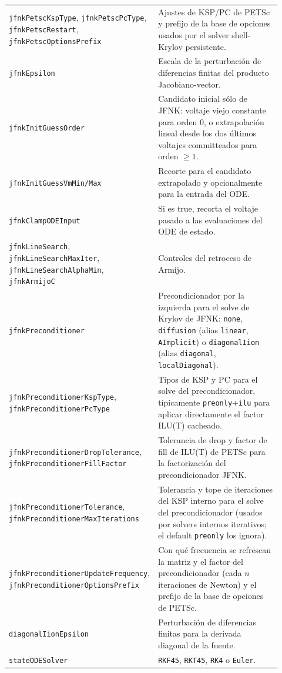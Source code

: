 \documentclass[11pt,a4paper]{article}
\newcommand{\code}[1]{\texttt{\small #1}}
\begin{document}
\begin{longtable}{@{}p{0.34\linewidth}p{0.58\linewidth}@{}}
\code{jfnkPetscKspType}, \code{jfnkPetscPcType}, \code{jfnkPetscRestart}, \code{jfnkPetscOptionsPrefix} & Ajustes de KSP/PC de PETSc y prefijo de la base de opciones usados por el solver shell-Krylov persistente. \\
\code{jfnkEpsilon} & Escala de la perturbación de diferencias finitas del producto Jacobiano-vector. \\
\code{jfnkInitGuessOrder} & Candidato inicial sólo de JFNK: voltaje viejo constante para orden 0, o extrapolación lineal desde los dos últimos voltajes committeados para orden $\ge 1$. \\
\code{jfnkInitGuessVmMin/Max} & Recorte para el candidato extrapolado y opcionalmente para la entrada del ODE. \\
\code{jfnkClampODEInput} & Si es true, recorta el voltaje pasado a las evaluaciones del ODE de estado. \\
\code{jfnkLineSearch}, \code{jfnkLineSearchMaxIter}, \code{jfnkLineSearchAlphaMin}, \code{jfnkArmijoC} & Controles del retroceso de Armijo. \\
\code{jfnkPreconditioner} & Precondicionador por la izquierda para el solve de Krylov de JFNK: \code{none}, \code{diffusion} (alias \code{linear}, \code{AImplicit}) o \code{diagonalIion} (alias \code{diagonal}, \code{localDiagonal}). \\
\code{jfnkPreconditionerKspType}, \code{jfnkPreconditionerPcType} & Tipos de KSP y PC para el solve del precondicionador, típicamente \code{preonly}+\code{ilu} para aplicar directamente el factor ILU(T) cacheado. \\
\code{jfnkPreconditionerDropTolerance}, \code{jfnkPreconditionerFillFactor} & Tolerancia de drop y factor de fill de ILU(T) de PETSc para la factorización del precondicionador JFNK. \\
\code{jfnkPreconditionerTolerance}, \code{jfnkPreconditionerMaxIterations} & Tolerancia y tope de iteraciones del KSP interno para el solve del precondicionador (usados por solvers internos iterativos; el default \code{preonly} los ignora). \\
\code{jfnkPreconditionerUpdateFrequency}, \code{jfnkPreconditionerOptionsPrefix} & Con qué frecuencia se refrescan la matriz y el factor del precondicionador (cada $n$ iteraciones de Newton) y el prefijo de la base de opciones de PETSc. \\
\code{diagonalIionEpsilon} & Perturbación de diferencias finitas para la derivada diagonal de la fuente. \\
\code{stateODESolver} & \code{RKF45}, \code{RKT45}, \code{RK4} o \code{Euler}. \\

\end{longtable}
\end{document}
